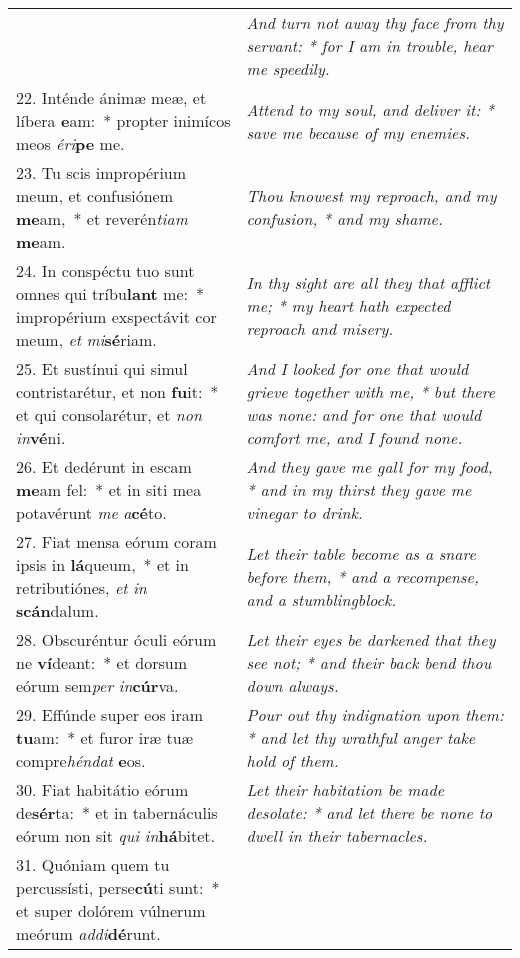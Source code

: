 \begin{longtable}{p{10cm} | p{6cm}}
 & \textit{\small And turn not away thy face from thy servant: * for I am in trouble, hear me speedily.
}\\
22. Inténde ánimæ meæ, et líbera \textbf{e}am:~* propter inimícos meos \textit{é}\textit{ri}\textbf{pe} me.
 & \textit{\small Attend to my soul, and deliver it: * save me because of my enemies.
}\\
23. Tu scis impropérium meum, et confusiónem \textbf{me}am,~* et reverén\textit{ti}\textit{am} \textbf{me}am.
 & \textit{\small Thou knowest my reproach, and my confusion, * and my shame.
}\\
24. In conspéctu tuo sunt omnes qui tríbu\textbf{lant} me:~* impropérium exspectávit cor meum, \textit{et} \textit{mi}\textbf{sé}riam.
 & \textit{\small In thy sight are all they that afflict me; * my heart hath expected reproach and misery.
}\\
25. Et sustínui qui simul contristarétur, et non \textbf{fu}it:~* et qui consolarétur, et \textit{non} \textit{in}\textbf{vé}ni.
 & \textit{\small And I looked for one that would grieve together with me, * but there was none: and for one that would comfort me, and I found none.
}\\
26. Et dedérunt in escam \textbf{me}am fel:~* et in siti mea potavérunt \textit{me} \textit{a}\textbf{cé}to.
 & \textit{\small And they gave me gall for my food, * and in my thirst they gave me vinegar to drink.
}\\
27. Fiat mensa eórum coram ipsis in \textbf{lá}queum,~* et in retributiónes, \textit{et} \textit{in} \textbf{scán}dalum.
 & \textit{\small Let their table become as a snare before them, * and a recompense, and a stumblingblock.
}\\
28. Obscuréntur óculi eórum ne \textbf{ví}deant:~* et dorsum eórum sem\textit{per} \textit{in}\textbf{cúr}va.
 & \textit{\small Let their eyes be darkened that they see not; * and their back bend thou down always.
}\\
29. Effúnde super eos iram \textbf{tu}am:~* et furor iræ tuæ compre\textit{hén}\textit{dat} \textbf{e}os.
 & \textit{\small Pour out thy indignation upon them: * and let thy wrathful anger take hold of them.
}\\
30. Fiat habitátio eórum de\textbf{sér}ta:~* et in tabernáculis eórum non sit \textit{qui} \textit{in}\textbf{há}bitet.
 & \textit{\small Let their habitation be made desolate: * and let there be none to dwell in their tabernacles.
}\\
31. Quóniam quem tu percussísti, perse\textbf{cú}ti sunt:~* et super dolórem vúlnerum meórum \textit{ad}\textit{di}\textbf{dé}runt.

\end{longtable}
